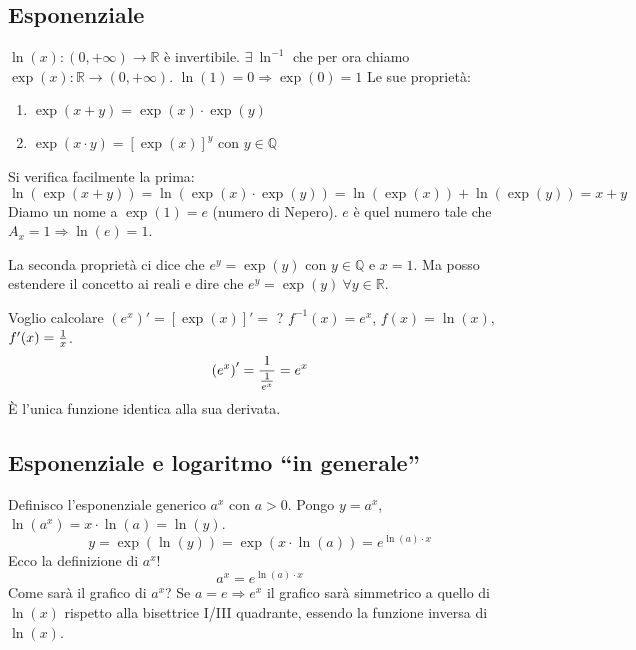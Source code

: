 \documentclass[12pt,a4paper]{article}
\begin{document}
\subsection{Esponenziale}
$\ln(x) : (0,+\infty) \to \mathbb{R}$ \`e invertibile. 
$\exists \ \ln^{-1}$ che per ora chiamo
$\exp(x): \mathbb{R} \to (0, +\infty)$. $\ln(1) = 0 \Rightarrow \exp(0) = 1 $
Le sue propriet\`a:
\begin{enumerate}
\item   $\exp(x+y) = \exp(x) \cdot \exp(y)$
\item   $\exp(x \cdot y) = \left[ \exp(x) \right]^{y}$ con $y \in \mathbb{Q}$
\end{enumerate}
Si verifica facilmente la prima:
$$ \ln \left( \exp(x +y) \right) = \ln \left( \exp(x) \cdot \exp(y) \right)
= \ln \left( \exp(x) \right) + \ln \left( \exp(y) \right) = x + y $$
Diamo un nome a $\exp(1) = e$ (numero di Nepero). $e$ \`e quel numero 
tale che $A_x = 1 \Rightarrow \ln(e) = 1$.

La seconda propriet\`a ci dice che $e^y = \exp(y)$ con $y \in \mathbb{Q}$
e $x = 1$. Ma posso estendere il concetto ai reali e dire che 
$e^y = \exp(y) \ \forall y \in \mathbb{R}$.

Voglio calcolare $\left( e^x \right)' = \left[ \exp(x) \right]' =$ ?
$f^{-1}(x) = e^x$, $f(x) = \ln(x)$, $f'(x) = {1 \over x}$.
$$ \left( e^x \right)' = {1 \over {1 \over e^x}} = e^x $$
\`E l'unica funzione identica alla sua derivata.

\subsection{Esponenziale e logaritmo ``in generale''}
Definisco l'esponenziale generico $a^x$ con $a>0$.
Pongo $y = a^x$, $\ln(a^x) = x \cdot \ln(a) = \ln(y)$.
$$ y = \exp \left( \ln(y) \right) = \exp \left( x \cdot \ln(a) \right) =
e^{\ln(a) \cdot x} $$
Ecco la definizione di $a^x$!
$$ a^x = e^{\ln(a) \cdot x} $$
Come sar\`a il grafico di $a^x$? Se $a=e \Rightarrow e^x$ il grafico
sar\`a simmetrico a quello di $\ln(x)$ rispetto alla bisettrice 
I/III quadrante, essendo la funzione inversa di $\ln(x)$.

\begin{center}
\end{center}
\end{document}
